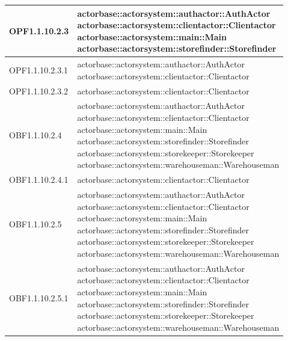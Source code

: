 \documentclass{scalatekids-article}
\begin{document}
\begin{longtable}[H]{|p{5cm}|p{12cm}|}
\hline
OPF1.1.10.2.3 & \multiLineCell[t]{actorbase::actorsystem::authactor::AuthActor\\actorbase::actorsystem::clientactor::Clientactor\\actorbase::actorsystem::main::Main\\actorbase::actorsystem::storefinder::Storefinder\\}\\
\hline
OPF1.1.10.2.3.1 & \multiLineCell[t]{actorbase::actorsystem::authactor::AuthActor\\actorbase::actorsystem::clientactor::Clientactor\\}\\
\hline
OPF1.1.10.2.3.2 & \multiLineCell[t]{actorbase::actorsystem::clientactor::Clientactor\\}\\
\hline
OBF1.1.10.2.4 & \multiLineCell[t]{actorbase::actorsystem::authactor::AuthActor\\actorbase::actorsystem::clientactor::Clientactor\\actorbase::actorsystem::main::Main\\actorbase::actorsystem::storefinder::Storefinder\\actorbase::actorsystem::storekeeper::Storekeeper\\actorbase::actorsystem::warehouseman::Warehouseman\\}\\
\hline
OBF1.1.10.2.4.1 & \multiLineCell[t]{actorbase::actorsystem::clientactor::Clientactor\\}\\
\hline
OBF1.1.10.2.5 & \multiLineCell[t]{actorbase::actorsystem::authactor::AuthActor\\actorbase::actorsystem::clientactor::Clientactor\\actorbase::actorsystem::main::Main\\actorbase::actorsystem::storefinder::Storefinder\\actorbase::actorsystem::storekeeper::Storekeeper\\actorbase::actorsystem::warehouseman::Warehouseman\\}\\
\hline
OBF1.1.10.2.5.1 & \multiLineCell[t]{actorbase::actorsystem::authactor::AuthActor\\actorbase::actorsystem::clientactor::Clientactor\\actorbase::actorsystem::main::Main\\actorbase::actorsystem::storefinder::Storefinder\\actorbase::actorsystem::storekeeper::Storekeeper\\actorbase::actorsystem::warehouseman::Warehouseman\\}\\

\end{longtable}
\end{document}

